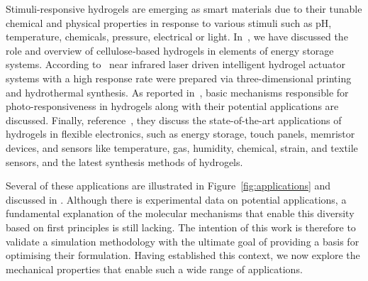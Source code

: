 Stimuli-responsive hydrogels are emerging as smart materials due to their tunable chemical and physical properties in response to various stimuli such as pH, temperature, chemicals, pressure, electrical or light. 
In~\citep{bishnoiCellulosebasedSmartMaterials2024}, we have discussed the role and overview of cellulose‐based hydrogels in elements of energy storage systems.
According to~\citep{zhaoIntelligentHydrogelActuators2021} near infrared laser driven intelligent hydrogel actuator systems with a high response rate were prepared via three-dimensional printing and hydrothermal synthesis.
As reported in~\citep{shomePhotoresponsiveSmartHydrogels2024}, basic mechanisms responsible for photo-responsiveness in hydrogels along with their potential applications are discussed.
Finally, reference~\citep{duttaSmartMaterialsFlexible2024}, they discuss the state-of-the-art applications of hydrogels in flexible electronics, such as energy storage, touch panels, memristor devices, and sensors like temperature, gas, humidity, chemical, strain, and textile sensors, and the latest synthesis methods of hydrogels.

Several of these applications are illustrated in Figure~\ref{fig:applications} and discussed in \citep{petelinsekToughHydrogelsLoadBearing2024}. 
Although there is experimental data on potential applications, a fundamental explanation of the molecular mechanisms that enable this diversity based on first principles is still lacking. 
The intention of this work is therefore to validate a simulation methodology with the ultimate goal of providing a basis for optimising their formulation. 
Having established this context, we now explore the mechanical properties that enable such a wide range of applications.

